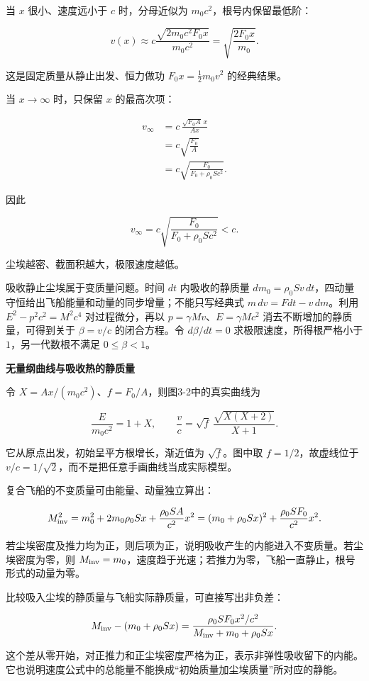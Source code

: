 \documentclass[12pt,a4paper,UTF8]{ctexart}
\begin{document}
当 \(x\) 很小、速度远小于 \(c\) 时，分母近似为
\(m_0c^2\)，根号内保留最低阶：

\[v(x)\approx
c\frac{\sqrt{2m_0c^2F_0x}}{m_0c^2}
=\sqrt{\frac{2F_0x}{m_0}}.\]

这是固定质量从静止出发、恒力做功 \(F_0x=\tfrac12m_0v^2\) 的经典结果。

当 \(x\to\infty\) 时，只保留 \(x\) 的最高次项：

\[\begin{aligned}
v_\infty
&=c\,
\frac{\sqrt{F_0A}\,x}{Ax}\\
&=c\sqrt{\frac{F_0}{A}}\\
&=c\sqrt{
\frac{F_0}{F_0+\rho_0Sc^2}
}.
\end{aligned}\]

因此

\[\boxed{
v_\infty
=c\sqrt{
\frac{F_0}{F_0+\rho_0Sc^2}
}<c
}.\]

尘埃越密、截面积越大，极限速度越低。

吸收静止尘埃属于变质量问题。时间 \(dt\) 内吸收的静质量
\(dm_0=\rho_0S v\,dt\)，四动量守恒给出飞船能量和动量的同步增量；不能只写经典式
\(m\,dv=Fdt-v\,dm\)。利用 \(E^2-p^2c^2=M^2c^4\) 对过程微分，再以
\(p=\gamma Mv\)、\(E=\gamma Mc^2\) 消去不断增加的静质量，可得到关于
\(\beta=v/c\) 的闭合方程。令 \(d\beta/dt=0\) 求极限速度，所得根严格小于
\(1\)，另一代数根不满足 \(0\le\beta<1\)。

\textbf{无量纲曲线与吸收热的静质量}

令 \(X=Ax/(m_0c^2)\)、\(f=F_0/A\)，则图3-2中的真实曲线为

\[\frac{E}{m_0c^2}=1+X,\qquad
\frac vc=\sqrt f\,\frac{\sqrt{X(X+2)}}{X+1}.\]

它从原点出发，初始呈平方根增长，渐近值为 \(\sqrt f\)。图中取
\(f=1/2\)，故虚线位于
\(v/c=1/\sqrt2\)，而不是把任意手画曲线当成实际模型。

复合飞船的不变质量可由能量、动量独立算出：

\[M_{\rm inv}^2=m_0^2+2m_0\rho_0Sx
+\frac{\rho_0SA}{c^2}x^2
=(m_0+\rho_0Sx)^2+\frac{\rho_0SF_0}{c^2}x^2.\]

若尘埃密度及推力均为正，则后项为正，说明吸收产生的内能进入不变质量。若尘埃密度为零，则
\(M_{\rm inv}=m_0\)，速度趋于光速；若推力为零，飞船一直静止，根号形式的动量为零。

比较吸入尘埃的静质量与飞船实际静质量，可直接写出非负差：

\[M_{\rm inv}-(m_0+\rho_0Sx)
=\frac{\rho_0SF_0x^2/c^2}
{M_{\rm inv}+m_0+\rho_0Sx}.\]

这个差从零开始，对正推力和正尘埃密度严格为正，表示非弹性吸收留下的内能。它也说明速度公式中的总能量不能换成``初始质量加尘埃质量''所对应的静能。
\end{document}
